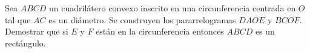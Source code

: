 Sea $ ABCD$ un cuadrilátero convexo inscrito en una circunferencia centrada en $ O$ tal que $ AC$ es un diámetro. Se construyen los pararrelogramas $ DAOE$ y $ BCOF$. Demostrar que si $ E$ y $ F$ están en la circunferencia entonces $ ABCD$ es un rectángulo.
